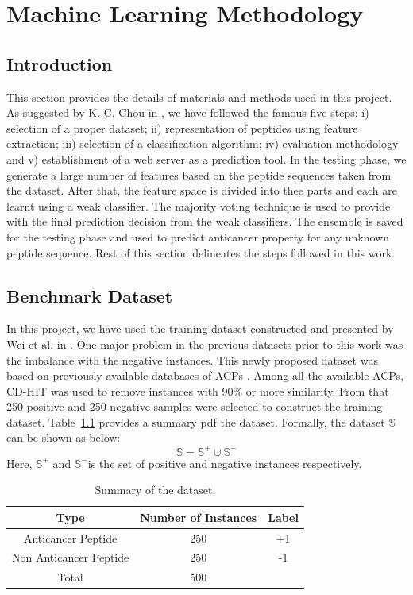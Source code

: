 \chapter{Machine Learning Methodology} \label{Methods}
\ifpdf
    \graphicspath{{chapter_3/figures/PNG/}{chapter_3/figures/PDF/}{chapter_3/figures/}}
\else
    \graphicspath{{chapter_3/figures/EPS/}{chapter_3/figures/}}
\fi
\section{Introduction}
This section provides the details of materials and methods used in this project. As suggested by K. C. Chou in \cite{chou2011some}, we have followed the famous five steps: i) selection of a proper dataset; ii) representation of peptides using feature extraction; iii) selection of a classification algorithm; iv) evaluation methodology and v) establishment of a web server as a prediction tool. In the testing phase, we generate a large number of features based on the peptide sequences taken from the dataset. After that, the feature space is divided into thee parts and each are learnt using a weak classifier. The majority voting technique is used to provide with the final prediction decision from the weak classifiers. The ensemble is saved for the testing phase and used to predict anticancer property for any unknown peptide sequence. Rest of this section delineates the steps followed in this work.

\section{Benchmark Dataset}
In this project, we have used the training dataset constructed and presented by Wei et al. in \cite{wei2018acpred}. One major problem in the previous datasets prior to this work was the imbalance with the negative instances. This newly proposed dataset was based on previously available databases of ACPs \cite{tyagi2013silico,tyagi2014cancerppd,chen2016iacp}. Among all the available ACPs, CD-HIT \cite{li2006cd} was used to remove instances with 90\% or more similarity. From that 250 positive and 250 negative samples were selected to construct the training dataset. Table~\ref{tab:dataset} provides a summary pdf the dataset. Formally, the dataset $\mathbb{S}$ can be shown as below: 
$$\mathbb{S}=\mathbb{S}^+ \cup \mathbb{S}^-$$
Here, $\mathbb{S}^+$ and $\mathbb{S}^-$is the set of positive and negative instances respectively.
\begin{table}[h]
\centering
\begin{tabular}{c|c|c}
    \bf Type &\bf  Number of Instances &\bf Label  \\
    \hline 
    Anticancer Peptide & 250 & +1\\
    Non Anticancer Peptide & 250 & -1\\
    \hline
    Total & 500\\
\end{tabular}
\caption{Summary of the dataset. \label{tab:dataset}}
\end{table}



